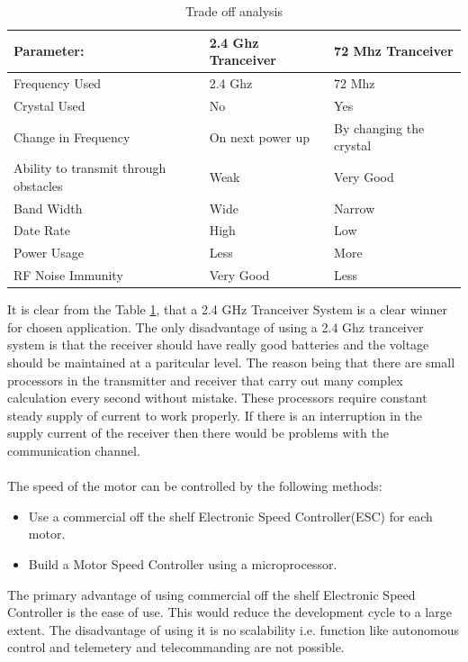 \begin{center}
\begin{table}[bht]
\begin{tabular}{||l l l||}
\hline\hline
\textbf{Parameter:} &  \textbf{2.4 Ghz Tranceiver} & \textbf{72 Mhz Tranceiver}\\ 
\hline
Frequency Used & 2.4 Ghz & 72 Mhz \\
Crystal Used & No & Yes \\
Change in Frequency & On next power up & By changing the crystal \\
Ability to transmit through obstacles & Weak & Very Good\\
Band Width & Wide & Narrow\\
Date Rate & High & Low\\
Power Usage & Less & More\\
RF Noise Immunity & Very Good & Less \\
\hline
\end{tabular}
\caption{Trade off analysis}
\label{tab:TradeOff}
\end{table}
\end{center}

It is clear from the Table \ref{tab:TradeOff}, that a 2.4 GHz Tranceiver System is a clear winner for chosen application. The only disadvantage of using a 2.4 Ghz tranceiver system is that the receiver should have really good batteries and the voltage should be maintained at a paritcular level. The reason being that there are small processors in the transmitter and receiver that carry out many complex calculation every second without mistake. These processors require constant steady supply of current to work properly. If there is an interruption in the supply current of the receiver then there would be problems with the communication channel.
\\
\\
The speed of the motor can be controlled by the following methods:
\begin{itemize}
\item Use a commercial off the shelf Electronic Speed Controller(ESC) for each motor.
\item Build a Motor Speed Controller using a microprocessor.
\end{itemize}

The primary advantage of using commercial off the shelf Electronic Speed Controller is the ease of use. This would reduce the development cycle to a large extent. The disadvantage of using it is no scalability i.e. function like autonomous control and telemetery and telecommanding are not possible.

